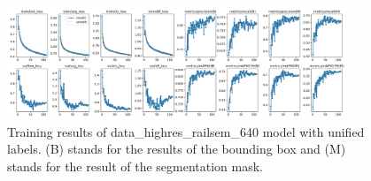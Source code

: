 \documentclass[Master,MDS,english]{BASE/twbook} %
\begin{document}
\begin{figure}[h]
\centering
\includegraphics[width=0.9\textwidth]{images/yolo/highres/results}
\caption{Training results of data\_highres\_railsem\_640 model with unified labels. (B) stands for the results of the bounding box and (M) stands for the result of the segmentation mask.}
\label{fig:training_highres}
\end{figure}
\end{document}
